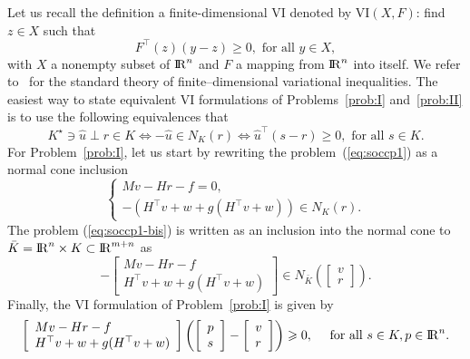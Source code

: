 Let us recall the definition a finite-dimensional VI denoted by $\mathrm{VI}(X,F)$: find $z\in X$ such that 
\begin{equation}
  \label{eq:vi}
  F^\top(z)(y-z) \geq 0, \text{ for all } y \in X,
\end{equation}
with $X$ a nonempty subset of $\mathrm{I\!R}^n$ and $F$ a mapping from $\mathrm{I\!R}^n$ into itself. We refer to~\cite{Harker.Pang1990,Facchinei.Pang2003} for the standard  theory of finite--dimensional variational inequalities. The easiest way to state equivalent VI formulations of Problems~\ref{prob:I} and~\ref{prob:II} is to use the following equivalences that
\begin{equation}
  \label{eq:SOCCP-1}
  K^\star \ni {\hat u} \perp r \in K \Longleftrightarrow
  - {\hat u} \in N_K(r)  \Longleftrightarrow \hat u^\top (s -r) \geq 0, \text{ for all } s \in K.
\end{equation}
For Problem~\ref{prob:I}, let us start by rewriting the problem~(\ref{eq:soccp1}) as a normal cone inclusion
\begin{equation}
  \label{eq:soccp1-bis}
  \left\{\begin{array}{l}
    M v-H r-f=0, \\[2mm]
   -(H^\top v + w + g(H^\top v + w)) \in N_K(r).
 \end{array}\right.
\end{equation}
The problem (\ref{eq:soccp1-bis}) is written as an inclusion into the normal cone to $\bar K = \mathrm{I\!R}^n  \times K\subset \mathrm{I\!R}^{m+n}$ as
\begin{equation}
  \label{eq:soccp1-ter}
  - \left[\begin{array}{l}
    M v-H r-f \\
    H^\top v+w  + g(H^\top v +w)
 \end{array}\right]    \in N_{\bar K}\left(
\left[\begin{array}{l}
  v \\r
\end{array}\right]
\right).
\end{equation}
Finally, the VI formulation of Problem~\ref{prob:I} is given by
\begin{equation}
  \label{eq:vi-I-bis}
  \left[\begin{array}{l}
    M v-H r-f \\
    H^\top v+w  + g(H^\top v +w)
  \end{array}\right] \left(
  \left[\begin{array}{l}
      p  \\ s
    \end{array}\right] - \left[\begin{array}{l}
      v  \\ r
    \end{array}\right]
\right) \geq 0,\quad \text{ for all } s \in K,  p \in \RR^n.
\end{equation}
